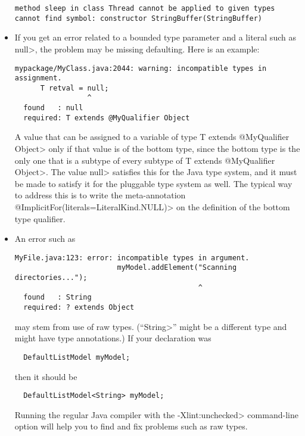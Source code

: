 \begin{itemize}
\begin{Verbatim}
method sleep in class Thread cannot be applied to given types
cannot find symbol: constructor StringBuffer(StringBuffer)
\end{Verbatim}

\item
If you get an error related to a bounded type parameter and a literal such
as \<null>, the problem may be missing defaulting.  Here is an example:

\begin{Verbatim}
mypackage/MyClass.java:2044: warning: incompatible types in assignment.
      T retval = null;
                 ^
  found   : null
  required: T extends @MyQualifier Object
\end{Verbatim}

\noindent
A value that can be assigned to a variable of type \<T extends @MyQualifier
Object> only if that value is of the bottom type, since the bottom type is
the only one that is a subtype of every subtype of \<T extends @MyQualifier
Object>.  The value \<null> satisfies this for the Java type system, and it
must be made to satisfy it for the pluggable type system as well.  The
typical way to address this is to write the meta-annotation
\<@ImplicitFor(literals={LiteralKind.NULL})> on the definition of the
bottom type qualifier.

\item
An error such as

\begin{Verbatim}
MyFile.java:123: error: incompatible types in argument.
                        myModel.addElement("Scanning directories...");
                                           ^
  found   : String
  required: ? extends Object
\end{Verbatim}

\noindent
may stem from use of raw types.  (``\<String>'' might be a different type
and might have type annotations.)  If your declaration was

\begin{Verbatim}
  DefaultListModel myModel;
\end{Verbatim}

\noindent
then it should be
\begin{Verbatim}
  DefaultListModel<String> myModel;
\end{Verbatim}

Running the regular Java compiler with the \<-Xlint:unchecked> command-line
option will help you to find and fix problems such as raw types.



\end{itemize}
